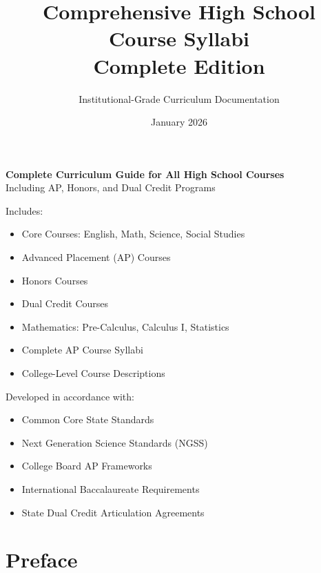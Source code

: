 \documentclass[12pt,oneside]{book}
\begin{document}
\frontmatter

\title{Comprehensive High School Course Syllabi\\
\large Complete Edition}
\author{Institutional-Grade Curriculum Documentation}
\date{January 2026}

\maketitle

\thispagestyle{empty}
\vspace*{\fill}
\begin{center}
\textbf{Complete Curriculum Guide for All High School Courses}\\[1em]
Including AP, Honors, and Dual Credit Programs
\end{center}

\vspace{1em}
\noindent Includes:
\begin{itemize}[leftmargin=2em]
    \item Core Courses: English, Math, Science, Social Studies
    \item Advanced Placement (AP) Courses
    \item Honors Courses
    \item Dual Credit Courses
    \item Mathematics: Pre-Calculus, Calculus I, Statistics
    \item Complete AP Course Syllabi
    \item College-Level Course Descriptions
\end{itemize}

\vspace{1em}
\noindent Developed in accordance with:
\begin{itemize}[leftmargin=2em]
    \item Common Core State Standards
    \item Next Generation Science Standards (NGSS)
    \item College Board AP Frameworks
    \item International Baccalaureate Requirements
    \item State Dual Credit Articulation Agreements
\end{itemize}
\vspace*{\fill}

\tableofcontents

\chapter*{Preface}
\end{document}
